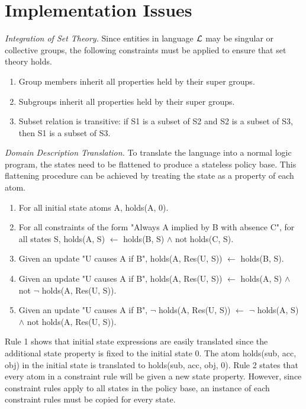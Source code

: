 \documentclass{llncs}
\begin{document}
  \section{Implementation Issues}

    \noindent
    \emph{Integration of Set Theory.} Since entities in language $\cal{L}$ may 
    be singular or collective groups, the following constraints must be applied
    to ensure that set theory holds.

    \begin{enumerate} 
      \item
        Group members inherit all properties held by their super groups.
      \item
        Subgroups inherit all properties held by their super groups.
      \item
        Subset relation is transitive: if S1 is a subset of S2 and S2 is a
        subset of S3, then S1 is a subset of S3.
    \end{enumerate}

    \noindent
    \emph{Domain Description Translation.} To translate the language into a
    normal logic program, the states need to be flattened to produce a
    stateless policy base. This flattening procedure can be achieved by
    treating the state as a property of each atom.

    \begin{enumerate}
      \item
        For all initial state atoms A, holds(A, 0).
      \item
        For all constraints of the form "Always A implied by B with
        absence C", for all states S, holds(A, S) $\leftarrow$ holds(B, S)
        $\land$ not holds(C, S).
      \item
        Given an update "U causes A if B", holds(A, Res(U, S)) $\leftarrow$
        holds(B, S).
      \item
        Given an update "U causes A if B", holds(A, Res(U, S)) $\leftarrow$
        holds(A, S) $\land$ not $\lnot$ holds(A, Res(U, S)).
      \item
        Given an update "U causes A if B", $\lnot$ holds(A, Res(U, S))
        $\leftarrow$ $\lnot$ holds(A, S) $\land$ not holds(A, Res(U, S)).
    \end{enumerate}

    Rule 1 shows that initial state expressions are easily translated since
    the additional state property is fixed to the initial state 0. The atom
    holds(sub, acc, obj) in the initial state is translated to holds(sub,
    acc, obj, 0). Rule 2 states that every atom in a constraint rule will be
    given a new state property. However, since constraint rules apply to all
    states in the policy base, an instance of each constraint rules must be
    copied for every state.
\end{document}
